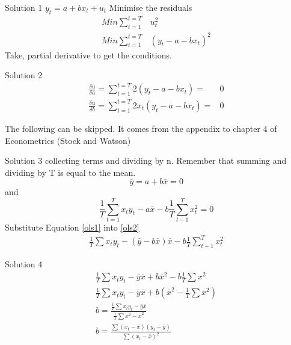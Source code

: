 \documentclass[14pt,xcolor=pdftex,dvipsnames,table]{beamer}\usepackage[]{graphicx}\usepackage[]{color}
\begin{document}
\begin{frame}{Solution 1}
$ y_t = a + bx_t + u_t$
\vskip 1cm
Minimise the residuals
\begin{align*}
Min\sum_{t=1}^{t=T}& u_t^2 \\
Min\sum_{t=1}^{t=T}& (y_t - a - bx_t)^2 
\end{align*}
Take, partial derivative to get the conditions.
\end{frame}

\begin{frame}{Solution 2}
\begin{align*}
\frac{\delta u}{\delta a} = \sum_{t=1}^{t=T} 2(y_t - a - bx_t) =& 0\\
\frac{\delta u}{\delta b} = \sum_{t=1}^{t=T} 2x_t(y_t - a - bx_t) =& 0
\end{align*}

The following can be skipped.  It comes from the appendix to chapter 4 of Econometrics (Stock and Watson)

\end{frame}

\begin{frame}{Solution 3}
collecting terms and dividing by n.  Remember that summing and dividing by T is equal to the mean. 
\begin{equation}\label{ols1}
\bar{y} = a + b\bar{x} = 0
\end{equation}
and
\begin{equation}\label{ols2}
\frac{1}{T} \sum_{t =1}^{T}x_ty_t - a\bar{x} -b\frac{1}{T}\sum_{t-1}^T x_t^2 =0
\end{equation}
Substitute Equation \ref{ols1} into \ref{ols2}
\begin{align*}
\frac{1}{T} \sum x_t y_t - \left (\bar{y} - b\bar{x} \right)\bar{x} - b\frac{1}{T}\sum_{t-1}^T x_t^2
\end{align*}
\end{frame}

\begin{frame}{Solution 4}
\begin{align*}
\frac{1}{T} \sum x_t y_t - \bar{y}\bar{x} + b \bar{x}^2 - b\frac{1}{T}\sum x^2\\
\frac{1}{T} \sum x_t y_t - \bar{y}\bar{x} + b \left (\bar{x}^2 - \frac{1}{T}\sum x^2 \right)\\
b = \frac{\frac{1}{T} \sum x_t y_t -\bar{y}\bar{x}}{\frac{1}{T} \sum x^2 -\bar{x}^2}\\
b= \frac{\sum (x_t  - \bar{x})(y_t - \bar{y})}{\sum (x_t - \bar{x})^2}
\end{align*}
\end{frame}
\end{document}
